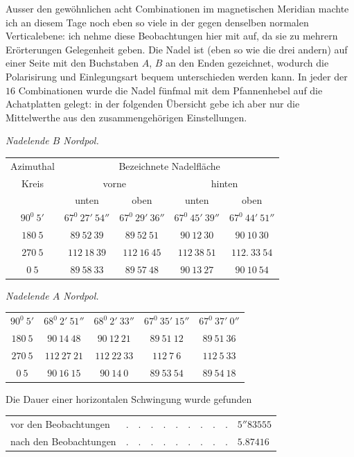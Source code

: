 Ausser den gewöhnlichen acht Combinationen im magnetischen Meridian machte ich an diesem Tage noch eben so viele in der gegen denselben normalen Verticalebene: ich nehme diese Beobachtungen hier mit auf, da sie zu mehrern Erörterungen Gelegenheit geben. Die Nadel ist (eben so wie die drei andern) auf einer Seite mit den Buchstaben $A$, $B$ an den Enden gezeichnet, wodurch die Polarisirung und Einlegungsart bequem unterschieden werden kann. In jeder der $16$ Combinationen wurde die Nadel fünfmal mit dem Pfannenhebel auf die Achatplatten gelegt: in der folgenden Übersicht gebe ich aber nur die Mittelwerthe aus den zusammengehörigen Einstellungen.

\begin{center}
\textit{Nadelende $B$ Nordpol.}\par\smallskip
{\fontsize{9}{11}\selectfont
\begin{tabular}{c||cc||cc}
Azimuthal&\multicolumn{4}{c}{Bezeichnete Nadelfläche}\\
Kreis&\multicolumn{2}{c||}{vorne}&\multicolumn{2}{c}{hinten}\\
&unten&oben&unten&oben\\\hline
$90^0\ 5'$&$67^0\ 27'\ 54''$&$67^0\ 29'\ 36''$&$67^0\ 45'\ 39''$&$67^0\ 44'\ 51''$\\
$180\ 5$&$89\ 52\ 39$&$89\ 52\ 51$&$90\ 12\ 30$&$90\ 10\ 30$\\
$270\ 5$&$112\ 18\ 39$&$112\ 16\ 45$&$112\ 38\ 51$&$112.\ 33\ 54$\\
$0\ 5$&$89\ 58\ 33$&$89\ 57\ 48$&$90\ 13\ 27$&$90\ 10\ 54$
\end{tabular}}
\par\medskip
\textit{Nadelende $A$ Nordpol.}\par\smallskip
{\fontsize{9}{11}\selectfont
\begin{tabular}{c||cc||cc}
$90^0\ 5'$&$68^0\ 2'\ 51''$&$68^0\ 2'\ 33''$&$67^0\ 35'\ 15''$&$67^0\ 37'\ 0''$\\
$180\ 5$&$90\ 14\ 48$&$90\ 12\ 21$&$89\ 51\ 12$&$89\ 51\ 36$\\
$270\ 5$&$112\ 27\ 21$&$112\ 22\ 33$&$112\ 7\ 6$&$112\ 5\ 33$\\
$0\ 5$&$90\ 16\ 15$&$90\ 14\ 0$&$89\ 53\ 54$&$89\ 54\ 18$
\end{tabular}}
\end{center}

Die Dauer einer horizontalen Schwingung wurde gefunden
\begin{center}
\begin{tabular}{lll}
vor den Beobachtungen&$.\quad.\quad.\quad.\quad.\quad.\quad.\quad.\quad.$&$5''83555$\\
nach den Beobachtungen&$.\quad.\quad.\quad.\quad.\quad.\quad.\quad.\quad.$&$5.87416$
\end{tabular}
\end{center}

